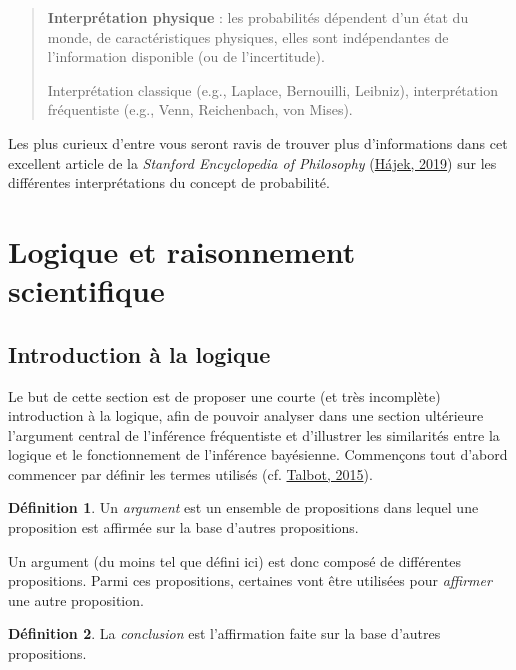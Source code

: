\documentclass[
  a4paper,11pt,twoside,onecolumn,openright,final,oldfontcommands]{memoir}
\theoremstyle{definition}
\newtheorem{definition}{Définition}[chapter]
\theoremstyle{definition}
\theoremstyle{definition}
\theoremstyle{definition}
\theoremstyle{remark}
\begin{document}
\begin{quote}
\textbf{Interprétation physique} : les probabilités dépendent d'un état du monde, de caractéristiques physiques, elles sont indépendantes de l'information disponible (ou de l'incertitude).

Interprétation classique (e.g., Laplace, Bernouilli, Leibniz), interprétation fréquentiste (e.g., Venn, Reichenbach, von Mises).
\end{quote}

Les plus curieux d'entre vous seront ravis de trouver plus d'informations dans cet excellent article de la \emph{Stanford Encyclopedia of Philosophy} (\protect\hyperlink{ref-sep-probability-interpret}{Hájek, 2019}) sur les différentes interprétations du concept de probabilité.

\hypertarget{logique-et-raisonnement-scientifique}{%
\section{Logique et raisonnement scientifique}\label{logique-et-raisonnement-scientifique}}

\hypertarget{introduction-uxe0-la-logique}{%
\subsection{Introduction à la logique}\label{introduction-uxe0-la-logique}}

Le but de cette section est de proposer une courte (et très incomplète) introduction à la logique, afin de pouvoir analyser dans une section ultérieure l'argument central de l'inférence fréquentiste et d'illustrer les similarités entre la logique et le fonctionnement de l'inférence bayésienne. Commençons tout d'abord commencer par définir les termes utilisés (cf. \protect\hyperlink{ref-talbot_critical_2015}{Talbot, 2015}).

\begin{definition}
\protect\hypertarget{def:argument}{}\label{def:argument}Un \emph{argument} est un ensemble de propositions dans lequel une proposition est affirmée sur la base d'autres propositions.
\end{definition}

Un argument (du moins tel que défini ici) est donc composé de différentes propositions. Parmi ces propositions, certaines vont être utilisées pour \emph{affirmer} une autre proposition.

\begin{definition}
\protect\hypertarget{def:concusion}{}\label{def:concusion}La \emph{conclusion} est l'affirmation faite sur la base d'autres propositions.
\end{definition}
\end{document}
